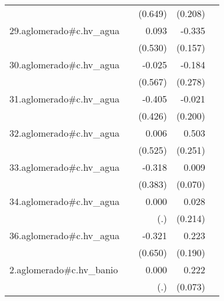 {\begin{longtable}{l*{4}{D{.}{.}{-1}}}
            &                     &     (0.649)         &     (0.208)         &                     \\
\addlinespace
29.aglomerado#c.hv\_agua&                     &       0.093         &      -0.335\sym{*}  &                     \\
            &                     &     (0.530)         &     (0.157)         &                     \\
\addlinespace
30.aglomerado#c.hv\_agua&                     &      -0.025         &      -0.184         &                     \\
            &                     &     (0.567)         &     (0.278)         &                     \\
\addlinespace
31.aglomerado#c.hv\_agua&                     &      -0.405         &      -0.021         &                     \\
            &                     &     (0.426)         &     (0.200)         &                     \\
\addlinespace
32.aglomerado#c.hv\_agua&                     &       0.006         &       0.503\sym{*}  &                     \\
            &                     &     (0.525)         &     (0.251)         &                     \\
\addlinespace
33.aglomerado#c.hv\_agua&                     &      -0.318         &       0.009         &                     \\
            &                     &     (0.383)         &     (0.070)         &                     \\
\addlinespace
34.aglomerado#c.hv\_agua&                     &       0.000         &       0.028         &                     \\
            &                     &         (.)         &     (0.214)         &                     \\
\addlinespace
36.aglomerado#c.hv\_agua&                     &      -0.321         &       0.223         &                     \\
            &                     &     (0.650)         &     (0.190)         &                     \\
\addlinespace
2.aglomerado#c.hv\_banio&                     &       0.000         &       0.222\sym{**} &                     \\
            &                     &         (.)         &     (0.073)         &                     \\

\end{longtable}}
